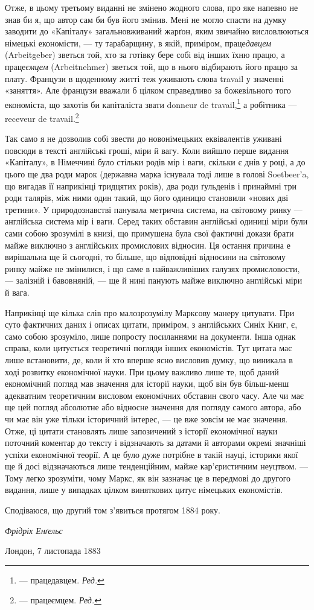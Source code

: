 Отже, в цьому третьому виданні не змінено жодного слова,
про яке напевно не знав би я, що автор сам би був його змінив.
Мені не могло спасти на думку заводити до «Капіталу» загальновживаний
жарґон, яким звичайно висловлюються німецькі економісти,
— ту тарабарщину, в якій, приміром, праце\emph{давцем} (Arbeitgeber)
зветься той, хто за готівку бере собі від інших їхню
працю, а праце\emph{ємцем} (Arbeitnehmer) зветься той, що в нього відбирають
його працю за плату. Французи в щоденному житті теж
уживають слова travail у значенні «заняття». Але французи
вважали б цілком справедливо за божевільного того економіста,
що захотів би капіталіста звати donneur de travail,\footnote*{
— працедавцем. \emph{Ред.}
} а робітника —
receveur de travail.\footnote*{ — працеємцем. \emph{Ред.}}

Так само я не дозволив собі звести до новонімецьких еквівалентів
уживані повсюди в тексті англійські гроші, міри й вагу. Коли
вийшло перше видання «Капіталу», в Німеччині було стільки
родів мір і ваги, скільки є днів у році, а до цього ще два роди
марок (державна марка існувала тоді лише в голові Soetbeer’a, що
вигадав її наприкінці тридцятих років), два роди ґульденів і
принаймні три роди талярів, між ними один такий, що його одиницю
становили «нових дві третини». У природознавстві панувала
метрична система, на світовому ринку — англійська система мір
і ваги. Серед таких обставин англійські одиниці міри були сами
собою зрозумілі в книзі, що примушена була свої фактичні докази
брати майже виключно з англійських промислових відносин. Ця
остання причина е вирішальна ще й сьогодні, то більше, що відповідні
відносини на світовому ринку майже не змінилися, і що саме
в найважливіших галузях промисловости, — залізній і бавовняній,
— ще й нині панують майже виключно англійські міри й вага.

Наприкінці ще кілька слів про малозрозумілу Марксову
манеру цитувати. При суто фактичних даних і описах цитати,
приміром, з англійських Синіх Книг, є, само собою зрозуміло,
лише попросту посиланнями на документи. Інша однак справа,
коли цитується теоретичні погляди інших економістів. Тут цитата
має лише встановити, де, коли й хто вперше ясно висловив
думку, що виникала в ході розвитку економічної науки. При
цьому важливо лише те, щоб даний економічний погляд мав
значення для історії науки, щоб він був більш-менш адекватним
теоретичним висловом економічних обставин свого часу. Але
чи має ще цей погляд абсолютне або відносне значення для погляду
самого автора, або чи має він уже тільки історичний
інтерес, — це вже зовсім не має значення. Отже, ці цитати становлять
лише запозичений з історії економічної науки поточний
коментар до тексту і відзначають за датами й авторами окремі
значніші успіхи економічної теорії. А це було дуже потрібне в
такій науці, історики якої ще й досі відзначаються лише тенденційним,
майже кар’єристичним неуцтвом. — Тому легко зрозуміти,
чому Маркс, як він зазначає це в передмові до другого видання,
лише у випадках цілком виняткових цитує німецьких економістів.

Сподіваюся, що другий том з’явиться протягом 1884 року.

\begin{flushright}
\emph{Фрідріх Енґельс}
\end{flushright}

{\small Лондон, 7 листопада 1883~}
